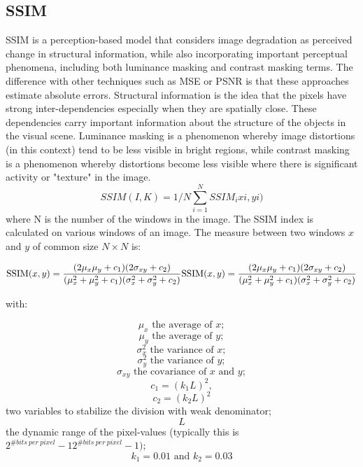 \documentclass[a4paper, 10pt]{book}
\begin{document}
\subsection{SSIM}
SSIM is a perception-based model that considers image degradation as perceived change in structural information, while also incorporating important perceptual phenomena, 
including both luminance masking and contrast masking terms. The difference with other techniques such as MSE or PSNR is that these approaches estimate absolute errors.
 Structural information is the idea that the pixels have strong inter-dependencies especially when they are spatially close. 
 These dependencies carry important information about the structure of the objects in the visual scene. 
 Luminance masking is a phenomenon whereby image distortions (in this context) tend to be less visible in bright regions, while contrast masking is a phenomenon whereby distortions become less visible where there is significant activity or "texture" in the image.
 \begin{equation}
    \label{eqn:SSIM}
SSIM(I,K) =1/N \sum\limits_{i=1}^N SSIM_{i}x{i},y{i})
\end{equation}
where N is the number of the windows in the image.
 The SSIM index is calculated on various windows of an image. The measure between two windows ${\displaystyle x}$ and ${\displaystyle y}$ of common size ${\displaystyle N\times N}$  is:

 \begin{equation}\label{eqn:SSIM_DOUBLE}
 {\displaystyle {\hbox{SSIM}}(x,y)={\frac {(2\mu _{x}\mu _{y}+c_{1})(2\sigma _{xy}+c_{2})}{(\mu _{x}^{2}+\mu _{y}^{2}+c_{1})(\sigma _{x}^{2}+\sigma _{y}^{2}+c_{2})}}}{\displaystyle {\hbox{SSIM}}(x,y)={\frac {(2\mu _{x}\mu _{y}+c_{1})(2\sigma _{xy}+c_{2})}{(\mu _{x}^{2}+\mu _{y}^{2}+c_{1})(\sigma _{x}^{2}+\sigma _{y}^{2}+c_{2})}}}
 \end{equation}

with:

$$ {\displaystyle \mu _{x}}{\text{ the average of }} {\displaystyle x};$$
$$ {\displaystyle \mu _{y}} {\text{ the average of }} {\displaystyle y};$$
 $${\displaystyle \sigma _{x}^{2}}{\text{ the variance of }} {\displaystyle x};$$
 $${\displaystyle \sigma _{y}^{2}}{\text{ the variance of  }}{\displaystyle y};$$
 $${\displaystyle \sigma _{xy}}{\text{ the covariance of }} {\displaystyle x} {\text{ and }} {\displaystyle y};$$
$$ {\displaystyle c_{1}=(k_{1}L)^{2}},$$
$${\displaystyle c_{2}=(k_{2}L)^{2}}$$
 two variables to stabilize the division with weak denominator;
$$ {\displaystyle L}$$ the dynamic range of the pixel-values (typically this is ${\displaystyle 2^{\#bits\ per\ pixel}-1}{\displaystyle 2^{\#bits\ per\ pixel}-1});$
 $${\displaystyle k_{1}=0.01} {\text{ and }} {\displaystyle k_{2}=0.03}$$ {}
\end{document}
